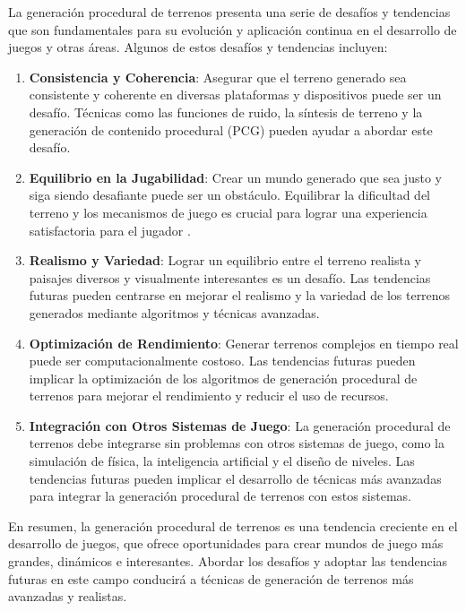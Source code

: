 La generación procedural de terrenos presenta una serie de desafíos y tendencias que son fundamentales para su evolución y aplicación continua en el desarrollo de juegos y otras áreas. Algunos de estos desafíos y tendencias incluyen:

\begin{enumerate}
    \item \textbf{Consistencia y Coherencia}: Asegurar que el terreno generado sea consistente y coherente en diversas plataformas y dispositivos puede ser un desafío. Técnicas como las funciones de ruido, la síntesis de terreno y la generación de contenido procedural (PCG) pueden ayudar a abordar este desafío\cite{ConsistencyCoherence}.
    
    \item \textbf{Equilibrio en la Jugabilidad}: Crear un mundo generado que sea justo y siga siendo desafiante puede ser un obstáculo. Equilibrar la dificultad del terreno y los mecanismos de juego es crucial para lograr una experiencia satisfactoria para el jugador \cite{BalancedGameplay}.
    
    \item \textbf{Realismo y Variedad}: Lograr un equilibrio entre el terreno realista y paisajes diversos y visualmente interesantes es un desafío. Las tendencias futuras pueden centrarse en mejorar el realismo y la variedad de los terrenos generados mediante algoritmos y técnicas avanzadas\cite{RealismVariety}.
    
    \item \textbf{Optimización de Rendimiento}: Generar terrenos complejos en tiempo real puede ser computacionalmente costoso. Las tendencias futuras pueden implicar la optimización de los algoritmos de generación procedural de terrenos para mejorar el rendimiento y reducir el uso de recursos\cite{PerformanceOptimization}.
    
    \item \textbf{Integración con Otros Sistemas de Juego}: La generación procedural de terrenos debe integrarse sin problemas con otros sistemas de juego, como la simulación de física, la inteligencia artificial y el diseño de niveles. Las tendencias futuras pueden implicar el desarrollo de técnicas más avanzadas para integrar la generación procedural de terrenos con estos sistemas\cite{IntegrationWithGameSystems}.
\end{enumerate}

En resumen, la generación procedural de terrenos es una tendencia creciente en el desarrollo de juegos, que ofrece oportunidades para crear mundos de juego más grandes, dinámicos e interesantes. Abordar los desafíos y adoptar las tendencias futuras en este campo conducirá a técnicas de generación de terrenos más avanzadas y realistas.

